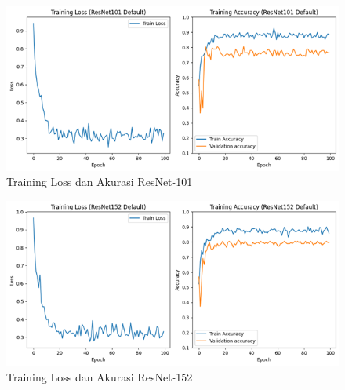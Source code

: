 \begin{figure}[hbtp]
	\centering
	\includegraphics[scale=0.8]{gambar/TrainingGraphResNet101.png}
	\caption{Training Loss dan Akurasi ResNet-101}
	\label{Img:GraphResNet101}
\end{figure}

\begin{figure}[hbtp]
	\centering
	\includegraphics[scale=0.8]{gambar/TrainingGraphResNet152.png}
	\caption{Training Loss dan Akurasi ResNet-152}
	\label{Img:GraphResNet152}
\end{figure}

